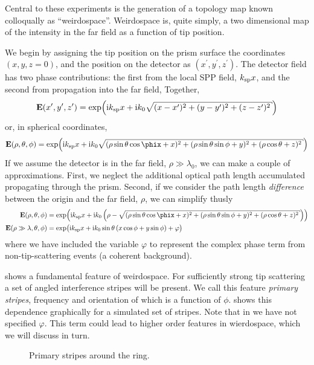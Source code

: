 Central to these experiments is the generation of a topology map known
colloqually as ``weirdospace''.  Weirdospace is, quite simply, a two
dimensional map of the intensity in the far field as a function of tip position.  

We begin by assigning the tip position on the prism surface the coordinates
$(x,y,z=0)$, and the position on the detector as
$(x^\prime,y^\prime,z^\prime)$.  The detector field has two phase
contributions: the first from the local SPP field, $k_\mathrm{sp} x$, and the second
from propagation into the far field, Together,
\begin{equation}
\mathbf{E}(x^\prime,y^\prime,z^\prime) = \exp\!\left( \mi\ksp x + %
\mi k_0\sqrt{ (x-x^\prime)^2+ (y-y^\prime)^2+ (z-z^\prime)^2 } \right)
\end{equation}
or, in spherical coordinates,
\begin{equation}
\mathbf{E}(\rho,\theta,\phi) = \exp\!\left( \mi\ksp x + %
\mi k_0\sqrt{
(\rho\sin\theta\cos\phix+x)^2+(\rho\sin\theta\sin\phi+y)^2+(\rho\cos\theta+z)^2 } \right)
\label{eqn:dingusthusly}
\end{equation}
If we assume the detector is in the far field, $\rho\gg\lambda_0$, we can
make a couple of approximations.  First, we neglect the additional optical
path length accumulated propagating through the prism.  Second, if we
consider the path length \textit{difference} between the origin and the far field,
$\rho$, we can simplify  thusly
\begin{align}
\mathbf{E}(\rho,\theta,\phi) &= \exp\!\left( \mi\ksp x + %
\mi k_0\left(\rho-\sqrt{ (\rho\sin\theta\cos\phix+x)^2+(\rho\sin\theta\sin\phi+y)^2+(\rho\cos\theta+z)^2
}\right) \right)\\
\mathbf{E}(\rho\gg\lambda,\theta,\phi) &= \exp\!\big( \mi \ksp x
 + \mi k_0 \sin\theta \left(x\cos\phi+y\sin\phi\right)
 + \varphi\big)
	\label{eqn:primarystripes}
\end{align}
where we have included the variable $\varphi$ to represent the complex phase term
from non-tip-scattering events (a coherent background).  

 shows a fundamental feature of weirdospace.
For sufficiently strong tip scattering a set of angled interference stripes
will be present.  We call this feature \textit{primary stripes},
frequency and orientation of which is a function of $\phi$.
 shows this
dependence graphically for a simulated set of stripes.  Note that in
 we have not specified $\varphi$.  This term
could lead to higher order features in wierdospace, which we will discuss
in turn.
\begin{figure}
\centering
\caption{Primary stripes around the ring.}
\label{fig:primarystripes}
\end{figure}
